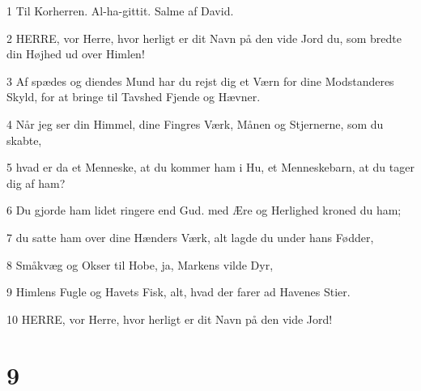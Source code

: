 \par 1 Til Korherren. Al-ha-gittit. Salme af David.
\par 2 HERRE, vor Herre, hvor herligt er dit Navn på den vide Jord du, som bredte din Højhed ud over Himlen!
\par 3 Af spædes og diendes Mund har du rejst dig et Værn for dine Modstanderes Skyld, for at bringe til Tavshed Fjende og Hævner.
\par 4 Når jeg ser din Himmel, dine Fingres Værk, Månen og Stjernerne, som du skabte,
\par 5 hvad er da et Menneske, at du kommer ham i Hu, et Menneskebarn, at du tager dig af ham?
\par 6 Du gjorde ham lidet ringere end Gud. med Ære og Herlighed kroned du ham;
\par 7 du satte ham over dine Hænders Værk, alt lagde du under hans Fødder,
\par 8 Småkvæg og Okser til Hobe, ja, Markens vilde Dyr,
\par 9 Himlens Fugle og Havets Fisk, alt, hvad der farer ad Havenes Stier.
\par 10 HERRE, vor Herre, hvor herligt er dit Navn på den vide Jord!

\chapter{9}

